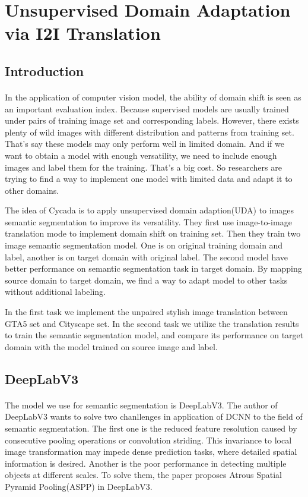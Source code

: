 \section{Unsupervised Domain Adaptation via I2I Translation}
\subsection{Introduction}
\paragraph{}
In the application of computer vision model, the ability of domain shift is seen as an important evaluation index. Because supervised models are usually trained under pairs of training image set and corresponding labels. However, there exists plenty of wild images with different distribution and patterns from training set. That's say these models may only perform well in limited domain. And if we want to obtain a model with enough versatility, we need to include enough images and label them for the training. That's a big cost. So researchers are trying to find a way to implement one model with limited data and adapt it to other domains.

The idea of Cycada\cite{cycada} is to apply unsupervised domain adaption(UDA) to images semantic segmentation to improve its versatility. They first use image-to-image translation mode to implement domain shift on training set. Then they train two image semantic segmentation model. One is on original training domain and label, another is on target domain with original label. The second model have better performance on semantic segmentation task in target domain. By mapping source domain to target domain, we find a way to adapt model to other tasks without additional labeling.

In the first task we implement the unpaired stylish image translation between GTA5 set and Cityscape set. In the second task we utilize the translation results to train the semantic segmentation model, and compare its performance on target domain with the model trained on source image and label. 

\subsection{DeepLabV3}
\paragraph{}
The model we use for semantic segmentation is DeepLabV3\cite{2017Rethinking}. The author of DeepLabV3 wants to solve two chanllenges in application of DCNN to the field of semantic segmentation. The first one is the reduced feature resolution caused by consecutive pooling operations or convolution striding. This invariance to local image transformation may impede dense prediction tasks, where detailed spatial information is desired. Another is the poor performance in detecting multiple objects at different scales. To solve them, the paper proposes Atrous Spatial Pyramid Pooling(ASPP) in DeepLabV3.

